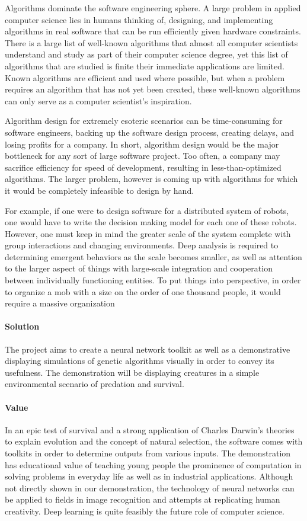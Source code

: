 \documentclass[letterpaper, 10pt]{article}
\begin{document}
	Algorithms dominate the software engineering sphere. A large problem in applied computer science lies in humans thinking of, designing, and implementing algorithms in real software that can be run efficiently given hardware constraints. There is a large list of well-known algorithms that almost all computer scientists understand and study as part of their computer science degree, yet this list of algorithms that are studied is finite their immediate applications are limited. Known algorithms are efficient and used where possible, but when a problem requires an algorithm that has not yet been created, these well-known algorithms can only serve as a computer scientist's inspiration.
	
	Algorithm design for extremely esoteric scenarios can be time-consuming for software engineers, backing up the software design process, creating delays, and losing profits for a company. In short, algorithm design would be the major bottleneck for any sort of large software project. Too often, a company may sacrifice efficiency for speed of development, resulting in less-than-optimized algorithms. The larger problem, however is coming up with algorithms for which it would be completely infeasible to design by hand.
	
	For example, if one were to design software for a distributed system of robots, one would have to write the decision making model for each one of these robots. However, one must keep in mind the greater scale of the system complete with group interactions and changing environments. Deep analysis is required to determining emergent behaviors as the scale becomes smaller, as well as attention to the larger aspect of things with large-scale integration and cooperation between individually functioning entities. To put things into perspective, in order to organize a mob with a size on the order of one thousand people, it would require a massive organization
	\paragraph{Solution} The project aims to create a neural network toolkit as well as a demonstrative displaying simulations of genetic algorithms visually in order to convey its usefulness. The demonstration will be displaying creatures in a simple environmental scenario of predation and survival.
\clearpage
	\paragraph{Value} In an epic test of survival and a strong application of Charles Darwin's theories to explain evolution and the concept of natural selection, the software comes with toolkits in order to determine outputs from various inputs. The demonstration has educational value of teaching young people the prominence of computation in solving problems in everyday life as well as in industrial applications. Although not directly shown in our demonstration, the technology of neural networks can be applied to fields in image recognition and attempts at replicating human creativity. Deep learning is quite feasibly the future role of computer science.
\cleardoublepage
\end{document}
